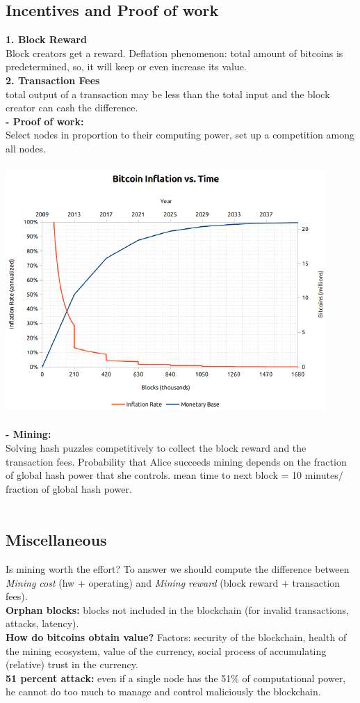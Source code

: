 \documentclass{article}
\begin{document}
\subsection{Incentives and Proof of work}
\textbf{1. Block Reward}\\
Block creators get a reward. Deflation phenomenon: total amount of bitcoins is predetermined, so, it will keep or even increase its value.\\
\textbf{2. Transaction Fees}\\
total output of a transaction may be less than the total input and the block creator can cash the difference.\\
\textbf{- Proof of work: }\\
Select nodes in proportion to their computing power, set up a competition among all nodes.\\\\
\includegraphics[scale=0.6]{16.png}\\\\
\textbf{- Mining: }\\
Solving hash puzzles competitively to collect the block reward and the transaction fees. Probability that Alice succeeds mining depends on the fraction of global hash power that she controls. mean time to next block = 10 minutes$/$ fraction of global hash power.\\\\
\subsection{Miscellaneous}
Is mining worth the effort? To answer we should compute the difference between \textit{Mining cost} (hw + operating) and \textit{Mining reward} (block reward + transaction fees).\\
\textbf{Orphan blocks: } blocks not included in the blockchain  (for invalid transactions, attacks, latency).\\
\textbf{How do bitcoins obtain value? }Factors: security of the blockchain, health of the mining ecosystem, value of the currency, social process of accumulating (relative) trust in the currency.\\
\textbf{51 percent attack: }even if a single node has the 51$\%$ of computational power, he cannot do too much to manage and control maliciously the blockchain.
\end{document}
